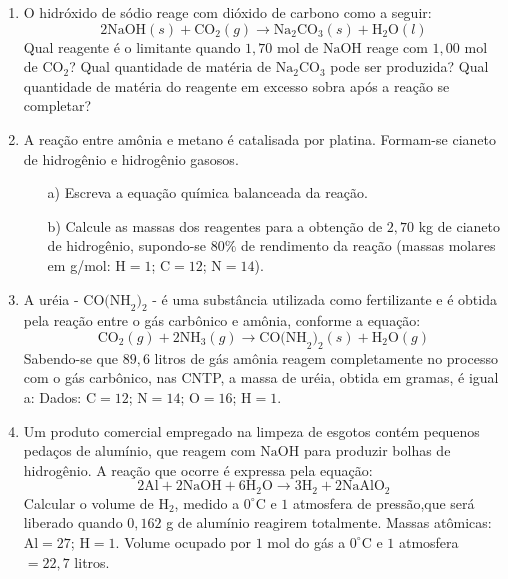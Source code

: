 \documentclass[a4paper, 12pt]{article}
\begin{document}
\begin{enumerate}
    \item O hidróxido de sódio reage com dióxido de carbono como a seguir:
          \[
              2\text{NaOH}(s) + \text{CO}_{2}(g) \rightarrow \text{Na}_{2}\text{CO}_{3}
              (s) + \text{H}_{2}\text{O}(l)
          \]
          Qual reagente é o limitante quando $1,70$ mol de $\text{NaOH}$ reage com
          $1,00$ mol de $\text{CO}_{2}$? Qual quantidade de matéria de $\text{Na}_{2}
              \text{CO}_{3}$ pode ser produzida? Qual quantidade de matéria do reagente
          em excesso sobra após a reação se completar?


    \item A reação entre amônia e metano é catalisada por platina. Formam-se
          cianeto de hidrogênio e hidrogênio gasosos.
          \begin{enumerate}[align=left, labelsep=-0.5em]
              \item[a)] Escreva a equação química balanceada da reação.

              \item[b)] Calcule as massas dos reagentes para a obtenção de $2,70$ kg de
                    cianeto de hidrogênio, supondo-se $80\%$ de rendimento da reação (massas
                    molares em g/mol: $\text{H}= 1$; $\text{C}= 12$; $\text{N}= 14$).
          \end{enumerate}


    \item A uréia - $\text{CO(NH}_{2})_{2}$ - é uma substância utilizada como fertilizante
          e é obtida pela reação entre o gás carbônico e amônia, conforme a equação:
          \[
              \text{CO}_{2}(g) + 2\text{NH}_{3}(g) \rightarrow \text{CO(NH}_{2})_{2}(s)
              + \text{H}_{2}\text{O}(g)
          \]
          Sabendo-se que $89,6$ litros de gás amônia reagem completamente no processo
          com o gás carbônico, nas CNTP, a massa de uréia, obtida em gramas, é igual
          a: Dados: $\text{C}= 12$; $\text{N}= 14$; $\text{O}= 16$; $\text{H}= 1$.


    \item Um produto comercial empregado na limpeza de esgotos contém pequenos pedaços
          de alumínio, que reagem com $\text{NaOH}$ para produzir bolhas de
          hidrogênio. A reação que ocorre é expressa pela equação:
          \[
              2\text{Al}+ 2\text{NaOH}+ 6\text{H}_{2}\text{O}\rightarrow 3\text{H}_{2}
              + 2\text{NaAlO}_{2}
          \]
          Calcular o volume de $\text{H}_{2}$, medido a $0^{\circ}$C e $1$ atmosfera
          de pressão,que será liberado quando $0,162$ g de alumínio reagirem totalmente.
          Massas atômicas: $\text{Al}= 27$; $\text{H}= 1$. Volume ocupado por $1$ mol
          do gás a $0^{\circ}$C e $1$ atmosfera $= 22,7$ litros.


\end{enumerate}
\end{document}
